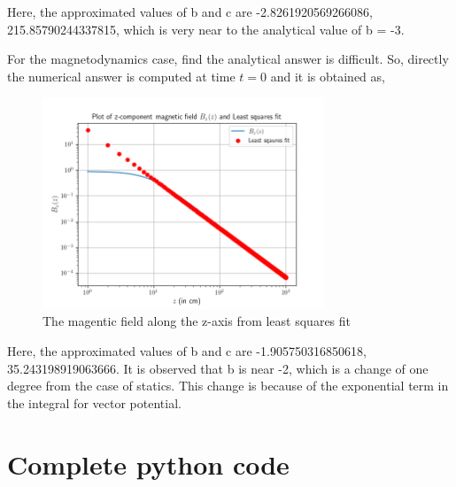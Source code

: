 \documentclass[12pt, a4paper]{article}
\begin{document}
Here, the approximated values of b and c are -2.8261920569266086, 215.85790244337815, which is very near to the analytical value of b = -3.

For the magnetodynamics case, find the analytical answer is difficult. So, directly the numerical answer is computed at time $t = 0$ and it is obtained as,

\begin{figure}[H]
\centering
\includegraphics[width=0.75\textwidth]{Bzconstfitdynamic.png}
\caption{The magentic field along the z-axis from least squares fit}
\end{figure}

Here, the approximated values of b and c are -1.905750316850618, 35.243198919063666. It is observed that b is near -2, which is a change of one degree from the case of statics. This change is because of the exponential term in the integral for vector potential.

\section{Complete python code}
\end{document}
